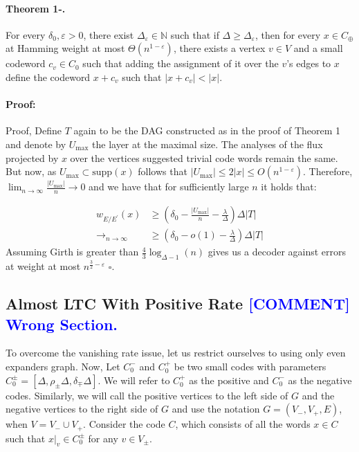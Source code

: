 \documentclass{article}
\newcommand{\commentt}[1]{\textcolor{blue}{ \textbf{[COMMENT]} #1}}
\newcommand{\ctt}[1]{\commentt{#1}}
\begin{document}
\begin{multicols*}{2}
  \paragraph{Theorem 1-.} For every $\delta_{0}, \varepsilon > 0$, there exist $\Delta_{\varepsilon}\in \mathbb{N}$ such that if $\Delta \ge \Delta_{\varepsilon}$, then for every $x \in C_{\oplus}$ at Hamming weight at most $ \Theta \left( n^{1-\varepsilon} \right) $, there exists a vertex $v \in V$ and a small codeword $c_{v} \in C_{0} $ such that adding the assignment of it over the $v$'s edges to $x$ define the codeword $x + c_{v}$  such that $|x + c_{v}| < |x|$.  
  \paragraph{Proof:} Proof, Define $T$ again to be the DAG constructed as in the proof of Theorem 1 and denote by $U_{\max}$ the layer at the maximal size. The analyses of the flux projected by $x$ over the vertices suggested trivial code words remain the same. But now, as $U_{\max} \subset \text{supp}(x)$ follows that $|U_{\max}| \le 2|x| \le O(n^{1-\varepsilon})$. Therefore, $ \lim_{n \rightarrow \infty} \frac{|U_{\max}|}{n} \rightarrow 0 $ and we have that for sufficiently large $n$ it holds that: 

  \begin{equation*}
    \begin{split}
        w_{E/E^{\prime}}\left( x \right) & \ge \left( \delta_{0} - \frac{|U_{\max}|}{n} - \frac{\lambda}{\Delta} \right) \Delta|T|  \\ 
	\rightarrow_{n \rightarrow \infty} &  \ge  \left( \delta_{0} - o(1)  - \frac{\lambda}{\Delta} \right) \Delta|T| 
    \end{split}
  \end{equation*}
  Assuming Girth is greater than $\frac{4}{3}\log_{\Delta-1}\left( n \right)$  gives us a decoder against errors at weight at most $n^{\frac{3}{2}-\varepsilon}$ $\square$. 


 \subsection{ Almost LTC With Positive Rate \ctt{ Wrong Section.  } } 
  To overcome the vanishing rate issue, let us restrict ourselves to using only even expanders graph. Now, Let $C_{0}^{-}$ and $C_{0}^{+}$ be two small codes with parameters $C_{0}^{\pm} = [\Delta, \rho_{\pm}\Delta, \delta_{\mp}\Delta]$. We will refer to $C_{0}^{+}$ as the positive and $C_{0}^{-}$ as the negative codes. Similarly, we will call the positive vertices to the left side of $G$ and the negative vertices to the right side of $G$ and use the notation $G = \left( V_{-}, V_{+}, E \right)$, when $V = V_{-} \cup V_{+}$. 
  Consider the code $C$, which consists of all the words $x\in C$ such that $x|_{v} \in C_{0}^{\pm}$ for any $v \in V_{\pm}$.

\end{multicols*}
\end{document}
